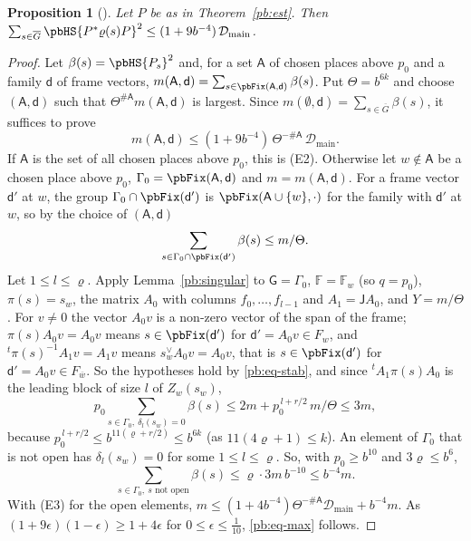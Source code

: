 \documentclass[10pt]{amsart}
\newtheorem{proposition}[theorem]{Proposition}
\theoremstyle{definition}
\theoremstyle{remark}
\providecommand{\auF}{\mathbb F}
\providecommand{\auG}{\overline G}
\providecommand{\aubar}[1]{\overline{#1}}
\providecommand{\pbDmain}{\mathcal D_{\mathrm{main}}}
\begin{document}
\begin{proposition}[{\cite[Proposition~14.32(iii)]{P46}}]\label{pb:iii}
Let $P$ be as in Theorem~\ref{pb:est}. Then $\sum_{s\in\auG}\pbHS{P^*\varrho(s)P}^2\le(1+9b^{-4})\,
\pbDmain$.
\end{proposition}
\begin{proof}
Let $\beta(s)=\pbHS{P_s}^2$ and, for a set $\mathsf A$ of chosen places above $p_0$ and a family
$\mathsf d$ of frame vectors, $m(\mathsf A,\mathsf d)=\sum_{s\in\pbFix(\mathsf A,\mathsf d)}
\beta(s)$. Put $\Theta=b^{6k}$ and choose $(\mathsf A,\mathsf d)$ such that $\Theta^{\#\mathsf A}
m(\mathsf A,\mathsf d)$ is largest. Since $m(\emptyset,\mathsf d)=\sum_{s\in\auG}\beta(s)$, it
suffices to prove
\begin{equation}\label{pb:eq-max}
m(\mathsf A,\mathsf d)\le(1+9b^{-4})\,\Theta^{-\#\mathsf A}\,\pbDmain .
\end{equation}
If $\mathsf A$ is the set of all chosen places above $p_0$, this is (E2). Otherwise let $w\notin
\mathsf A$ be a chosen place above $p_0$, $\Gamma_0=\pbFix(\mathsf A,\mathsf d)$ and $m=m(\mathsf A,
\mathsf d)$. For a frame vector $\mathsf d'$ at $w$, the group $\Gamma_0\cap\pbFix(\mathsf d')$ is
$\pbFix(\mathsf A\cup\{w\},\cdot)$ for the family with $\mathsf d'$ at $w$, so by the choice of
$(\mathsf A,\mathsf d)$
\begin{equation}\label{pb:eq-stab}
\sum_{s\in\Gamma_0\cap\pbFix(\mathsf d')}\beta(s)\le m/\Theta .
\end{equation}
Let $1\le l\le\varrho$. Apply Lemma~\ref{pb:singular} to $\mathsf G=\Gamma_0$, $\auF=\auF_w$ (so
$q=p_0$), $\pi(s)=s_w$, the matrix $A_0$ with columns $f_0,\dots,f_{l-1}$ and $A_1=\mathsf JA_0$,
and $Y=m/\Theta$. For $v\ne0$ the vector $A_0v$ is a non-zero vector of the span of the frame;
$\pi(s)A_0v=A_0v$ means $s\in\pbFix(\mathsf d')$ for $\mathsf d'=A_0v\in F_w$, and ${}^t\pi(s)^{-1}
A_1v=A_1v$ means $s_w^\vee A_0v=A_0v$, that is $s\in\pbFix(\mathsf d')$ for $\mathsf d'=A_0v\in
F_{\aubar w}$. So the hypotheses hold by \eqref{pb:eq-stab}, and since ${}^tA_1\pi(s)A_0$ is the
leading block of size $l$ of $Z_w(s_w)$,
\[
p_0\sum_{s\in\Gamma_0,\ \delta_l(s_w)=0}\beta(s)\le2m+p_0^{\,l+r/2}\,m/\Theta\le3m ,
\]
because $p_0^{\,l+r/2}\le b^{11(\varrho+r/2)}\le b^{6k}$ (as $11(4\varrho+1)\le k$). An element of
$\Gamma_0$ that is not open has $\delta_l(s_w)=0$ for some $1\le l\le\varrho$. So, with
$p_0\ge b^{10}$ and $3\varrho\le b^6$,
\[
\sum_{s\in\Gamma_0,\ s\text{ not open}}\beta(s)\le\varrho\cdot3m\,b^{-10}\le b^{-4}m .
\]
With (E3) for the open elements, $m\le(1+4b^{-4})\Theta^{-\#\mathsf A}\pbDmain+b^{-4}m$. As $(1+9
\epsilon)(1-\epsilon)\ge1+4\epsilon$ for $0\le\epsilon\le\frac1{10}$, \eqref{pb:eq-max} follows.
\end{proof}
\end{document}
